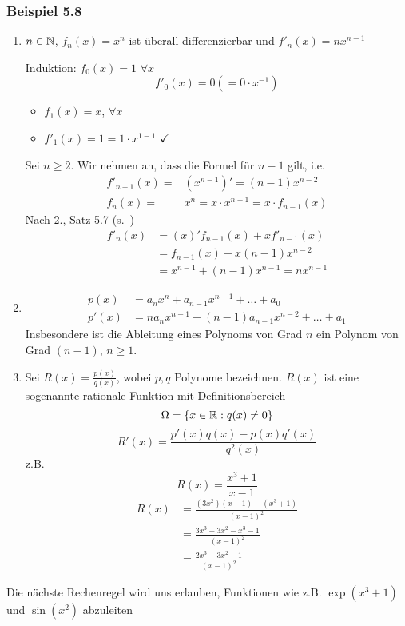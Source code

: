 \subsubsection*{Beispiel 5.8}
\begin{enumerate}
\item $n\in\mathbb{N}$, $f_n\left( x\right)=x^n$ ist überall differenzierbar und $f'_n\left( x\right) = nx^{n-1}$
\begin{beweis}{}
Induktion: $f_0\left( x\right) = 1$ $\forall x$ \[f'_0\left( x\right) = 0 \left( = 0\cdot x^{-1}\right)\]
\begin{itemize}
\item $f_1\left( x\right) = x$, $\forall x$
\item $f'_1\left( x\right) = 1 = 1\cdot x^{1-1}$ $\checkmark$
\end{itemize}
Sei $n\geq 2$. Wir nehmen an, dass die Formel für $n-1$ gilt, i.e.
\begin{align*}
f{'_{n - 1}}\left( x \right) =& \left( {{x^{n - 1}}} \right)' = \left( {n - 1} \right){x^{n - 2}}\\
{f_n}\left( x \right) =&  {x^n} = x \cdot {x^{n - 1}} = x \cdot {f_{n - 1}}\left( x \right)
\end{align*}
Nach 2., Satz 5.7 (s.~\pageref{satz5.7,2.})
\begin{align*}
f{'_n}\left( x \right) &= \left( x \right)'{f_{n - 1}}\left( x \right) + xf{'_{n - 1}}\left( x \right)\\
 &= {f_{n - 1}}\left( x \right) + x\left( {n - 1} \right){x^{n - 2}}\\
 &= {x^{n - 1}} + \left( {n - 1} \right){x^{n - 1}} = n{x^{n - 1}}
\end{align*}
\end{beweis}
\item \begin{align*}
p(x)&=a_nx^n+a_{n-1}x^{n-1}+\dots+a_0\\
p'(x)&=na_nx^{n-1}+\left( n-1\right)a_{n-1}x^{n-2}+\dots+a_1
\end{align*}
Insbesondere ist die Ableitung eines Polynoms von Grad $n$ ein Polynom von Grad $\left( n-1\right)$, $n\geq 1$.
\item Sei $R(x)=\frac{p(x)}{q(x)}$, wobei $p,q$ Polynome bezeichnen. $R(x)$ ist eine sogenannte rationale Funktion mit Definitionsbereich
\[\Omega = \left\{ x\in\mathbb{R} : q(x)\not=0\right\}\]
\[R'(x) = \frac{{p'(x)q(x) - p(x)q'(x)}}{{{q^2}(x)}}\]
z.B. \[R(x) = \frac{{{x^3} + 1}}{{x - 1}}\]
\begin{align*}
R(x) &= \frac{{\left( {3{x^2}} \right)\left( {x - 1} \right) - \left( {{x^3} + 1} \right)}}{{{{\left( {x - 1} \right)}^2}}}\\
 &= \frac{{3{x^3} - 3{x^2} - {x^3} - 1}}{{{{\left( {x - 1} \right)}^2}}}\\
 &= \frac{{2{x^3} - 3{x^2} - 1}}{{{{\left( {x - 1} \right)}^2}}}
\end{align*}
\end{enumerate}
Die nächste Rechenregel wird uns erlauben, Funktionen wie z.B. $\exp\left( x^3+1\right)$ und $\sin\left( x^2\right)$ abzuleiten


